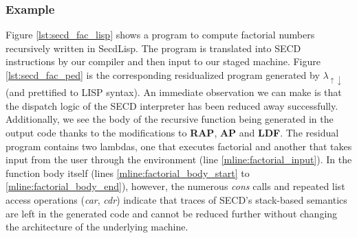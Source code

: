 \documentclass[a4paper,12pt,twoside,openright]{report}
\theoremstyle{definition}
\newcommand{\mslang}{$\lambda_{\uparrow\downarrow}$}
\newcommand{\secdlisp}{SecdLisp}
\begin{document}
\newpage
\subsubsection{Example}
Figure \ref{lst:secd_fac_lisp} shows a program to compute factorial numbers recursively written in \secdlisp. The program is translated into SECD instructions by our compiler and then input to our staged machine. Figure \ref{lst:secd_fac_ped} is the corresponding residualized program generated by \mslang (and prettified to LISP syntax). An immediate observation we can make is that the dispatch logic of the SECD interpreter has been reduced away successfully. Additionally, we see the body of the recursive function being generated in the output code thanks to the modifications to \textbf{RAP}, \textbf{AP} and \textbf{LDF}. The residual program contains two lambdas, one that executes factorial and another that takes input from the user through the environment (line \ref{mline:factorial_input}). In the function body itself (lines \ref{mline:factorial_body_start} to \ref{mline:factorial_body_end}), however, the numerous \textit{cons} calls and repeated list access operations (\textit{car}, \textit{cdr}) indicate that traces of SECD's stack-based semantics are left in the generated code and cannot be reduced further without changing the architecture of the underlying machine.
\end{document}
